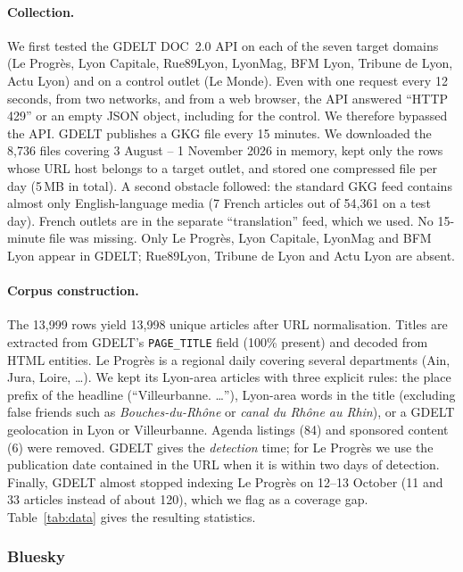 \documentclass[pdflatex,sn-mathphys-num]{sn-jnl}
\begin{document}
\paragraph{Collection.} We first tested the GDELT DOC~2.0 API on each of the seven target domains (Le Progr\`es, Lyon Capitale, Rue89Lyon, LyonMag, BFM Lyon, Tribune de Lyon, Actu Lyon) and on a control outlet (Le Monde). Even with one request every 12 seconds, from two networks, and from a web browser, the API answered ``HTTP 429'' or an empty JSON object, including for the control. We therefore bypassed the API. GDELT publishes a GKG file every 15 minutes. We downloaded the 8,736 files covering 3 August -- 1 November 2026 in memory, kept only the rows whose URL host belongs to a target outlet, and stored one compressed file per day (5\,MB in total). A second obstacle followed: the standard GKG feed contains almost only English-language media (7 French articles out of 54,361 on a test day). French outlets are in the separate ``translation'' feed, which we used. No 15-minute file was missing. Only Le Progr\`es, Lyon Capitale, LyonMag and BFM Lyon appear in GDELT; Rue89Lyon, Tribune de Lyon and Actu Lyon are absent.

\paragraph{Corpus construction.} The 13,999 rows yield 13,998 unique articles after URL normalisation. Titles are extracted from GDELT's \texttt{PAGE\_TITLE} field (100\% present) and decoded from HTML entities. Le Progr\`es is a regional daily covering several departments (Ain, Jura, Loire, \dots). We kept its Lyon-area articles with three explicit rules: the place prefix of the headline (``Villeurbanne. \dots''), Lyon-area words in the title (excluding false friends such as \emph{Bouches-du-Rh\^one} or \emph{canal du Rh\^one au Rhin}), or a GDELT geolocation in Lyon or Villeurbanne. Agenda listings (84) and sponsored content (6) were removed. GDELT gives the \emph{detection} time; for Le Progr\`es we use the publication date contained in the URL when it is within two days of detection. Finally, GDELT almost stopped indexing Le Progr\`es on 12--13 October (11 and 33 articles instead of about 120), which we flag as a coverage gap. Table~\ref{tab:data} gives the resulting statistics.

\subsubsection{Bluesky}
\end{document}
